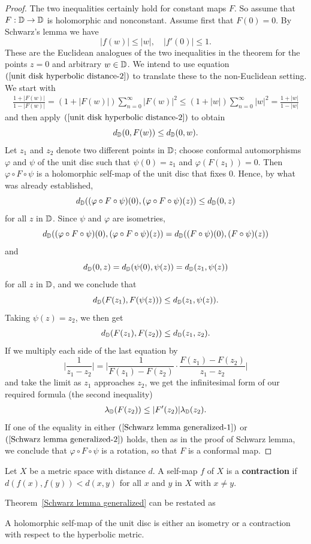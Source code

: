 \begin{proof}
The two inequalities certainly hold for constant maps $F$. So assume that $F:\mathbb{D}\to\mathbb{D}$ is holomorphic and nonconstant. Assume first that $F(0)=0$. By Schwarz's lemma we have
\[|f(w)|\leq|w|,\quad |f'(0)|\leq 1.\]
These are the Euclidean analogues of the two inequalities in the theorem for the points $z=0$ and arbitrary $w\in\mathbb{D}$. We intend to use equation $(\ref{unit disk hyperbolic distance-2})$ to translate these to the non-Euclidean setting. We start with
\begin{align*}
\frac{1+|F(w)|}{1-|F(w)|}=(1+|F(w)|)\sum_{n=0}^{\infty}|F(w)|^2\leq(1+|w|)\sum_{n=0}^{\infty}|w|^2=\frac{1+|w|}{1-|w|}
\end{align*}
and then apply $(\ref{unit disk hyperbolic distance-2})$ to obtain
\[d_{\mathbb{D}}(0,F(w))\leq d_{\mathbb{D}}(0,w).\]
Let $z_1$ and $z_2$ denote two different points in $\mathbb{D}$; choose conformal automorphisms $\varphi$ and $\psi$ of the unit disc such that $\psi(0)=z_1$ and $\varphi(F(z_1))=0$. Then $\varphi\circ F\circ\psi$ is a holomorphic self-map of the unit disc that fixes $0$. Hence, by what was already established,
\[d_{\mathbb{D}}((\varphi\circ F\circ\psi)(0),(\varphi\circ F\circ\psi)(z))\leq d_{\mathbb{D}}(0,z)\]
for all $z$ in $\mathbb{D}$. Since $\psi$ and $\varphi$ are isometries,
\[d_{\mathbb{D}}((\varphi\circ F\circ\psi)(0),(\varphi\circ F\circ\psi)(z))=d_{\mathbb{D}}((F\circ\psi)(0),(F\circ\psi)(z))\]
and
\[d_{\mathbb{D}}(0,z)=d_{\mathbb{D}}(\psi(0),\psi(z))=d_{\mathbb{D}}(z_1,\psi(z))\]
for all $z$ in $\mathbb{D}$, and we conclude that
\[d_{\mathbb{D}}(F(z_1),F(\psi(z)))\leq d_{\mathbb{D}}(z_1,\psi(z)).\]
Taking $\psi(z)=z_2$, we then get
\begin{align}\label{Schwarz lemma generalized-1}
d_{\mathbb{D}}(F(z_1),F(z_2))\leq d_{\mathbb{D}}(z_1,z_2).
\end{align}
If we multiply each side of the last equation by
\[\Big|\frac{1}{z_1-z_2}\Big|=\Big|\frac{1}{F(z_1)-F(z_2)}\cdot\frac{F(z_1)-F(z_2)}{z_1-z_2}\Big|\]
and take the limit as $z_1$ approaches $z_2$, we get the infinitesimal form of our required formula (the second inequality)
\begin{align}\label{Schwarz lemma generalized-2}
\lambda_{\mathbb{D}}(F(z_2))\leq|F'(z_2)|\lambda_{\mathbb{D}}(z_2).
\end{align}
If one of the equality in either $(\ref{Schwarz lemma generalized-1})$ or $(\ref{Schwarz lemma generalized-2})$ holds, then as in the proof of Schwarz lemma, we conclude that $\varphi\circ F\circ\psi$ is a rotation, so that $F$ is a conformal map.
\end{proof}
\begin{definition}
Let $X$ be a metric space with distance $d$. A self-map $f$ of $X$ is a \textbf{contraction} if $d(f(x),f(y))<d(x,y)$ for all $x$ and $y$ in $X$ with $x\neq y$.
\end{definition}
Theorem~\ref{Schwarz lemma generalized} can be restated as
\begin{theorem}
A holomorphic self-map of the unit disc is either an isometry or a contraction with respect to the hyperbolic metric.
\end{theorem}

